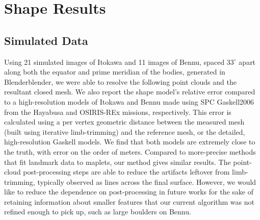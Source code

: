 \section{Shape Results}
\subsection{Simulated Data}
Using 21 simulated images of Itokawa and 11 images of Bennu, spaced $33^{\circ}$ apart along both the equator and prime meridian of the bodies, generated in Blender{blender}, we were able to resolve the following point clouds and the resultant closed mesh. We also report the shape model's relative error compared to a high-resolution models of Itokawa and Bennu made using SPC {Gaskell2006} from the Hayabusa and OSIRIS-REx missions, respectively. This error is calculated using a per vertex geometric distance between the measured mesh (built using iterative limb-trimming) and the reference mesh, or the detailed, high-resolution Gaskell models. We find that both models are extremely close to the truth, with error on the order of meters. Compared to more-precise methods that fit landmark data to maplets, our method gives similar results. The point-cloud post-processing steps are able to reduce the artifacts leftover from limb-trimming, typically observed as lines across the final surface. However, we would like to reduce the dependence on post-processing in future works for the sake of retaining information about smaller features that our current algorithm was not refined enough to pick up, such as large boulders on Bennu.
